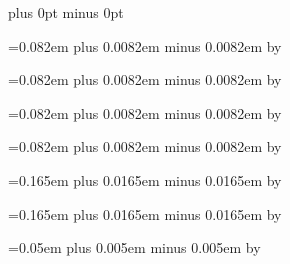 \def\endofsyllable{%
\penalty -500%
}


\def\endofelement#1{%
\ifcase#1%
\hskip\interelementspace%
\or%
\hskip\largerspace%
\or%
\hskip\glyphspace%
\fi%
\penalty -100%
}


\def\endofglyph#1{%
\ifcase#1%
\hskip\interglyphspace %
\or%
\hskip\zerowidthspace %
\or%
\hskip\alterationspace %
\or%
\hskip\punctuminclinatumshift %
\or%
\hskip\bispace %
\or%
\hskip\trispace %
\fi%
\penalty 10001%
}


\newskip\zerowidthspace
\zerowidthspace=0pt plus 0pt minus 0pt

\newskip\interglyphspace
\interglyphspace=0.082em plus 0.0082em minus 0.0082em
\multiply\interglyphspace by \factor

\newskip\alterationspace
\alterationspace=0.082em plus 0.0082em minus 0.0082em
\multiply\alterationspace by \factor

\newskip\interelementspace
\interelementspace=0.082em plus 0.0082em minus 0.0082em
\multiply\interelementspace by \factor

\newskip\largerspace
\largerspace=0.082em plus 0.0082em minus 0.0082em
\multiply\largerspace by \factor

\newskip\glyphspace
\glyphspace=0.165em plus 0.0165em minus 0.0165em
\multiply\glyphspace by \factor

\newskip\spacebeforecusto
\spacebeforecusto=0.165em plus 0.0165em minus 0.0165em
\multiply\spacebeforecusto by \factor

\newskip\spacebeforesigns
\spacebeforesigns=0.05em plus 0.005em minus 0.005em
\multiply\spacebeforesigns by \factor

